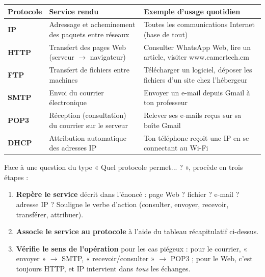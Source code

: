 \documentclass[11pt]{article}
\begin{document}
\begin{center}
\begin{tabularx}{\linewidth}{|l|X|X|}
\hline
\rowcolor{popblueL} \textbf{Protocole} & \textbf{Service rendu} & \textbf{Exemple d'usage quotidien} \\
\hline
\textbf{IP} & Adressage et acheminement des paquets entre réseaux & Toutes les communications Internet (base de tout) \\
\hline
\textbf{HTTP} & Transfert des pages Web (serveur $\to$ navigateur) & Consulter WhatsApp Web, lire un article, visiter www.camertech.cm \\
\hline
\textbf{FTP} & Transfert de fichiers entre machines & Télécharger un logiciel, déposer les fichiers d'un site chez l'hébergeur \\
\hline
\textbf{SMTP} & Envoi du courrier électronique & Envoyer un e-mail depuis Gmail à ton professeur \\
\hline
\textbf{POP3} & Réception (consultation) du courrier sur le serveur & Relever ses e-mails reçus sur sa boîte Gmail \\
\hline
\textbf{DHCP} & Attribution automatique des adresses IP & Ton téléphone reçoit une IP en se connectant au Wi-Fi \\
\hline
\end{tabularx}
\end{center}

\begin{methode}
Face à une question du type « Quel protocole permet... ? », procède en trois étapes :
\begin{enumerate}
\item \textbf{Repère le service} décrit dans l'énoncé : page Web ? fichier ? e-mail ? adresse IP ? Souligne le verbe d'action (consulter, envoyer, recevoir, transférer, attribuer).
\item \textbf{Associe le service au protocole} à l'aide du tableau récapitulatif ci-dessus.
\item \textbf{Vérifie le sens de l'opération} pour les cas piégeux : pour le courrier, « envoyer » $\to$ SMTP, « recevoir/consulter » $\to$ POP3 ; pour le Web, c'est toujours HTTP, et IP intervient dans \emph{tous} les échanges.
\end{enumerate}
\end{methode}
\end{document}
